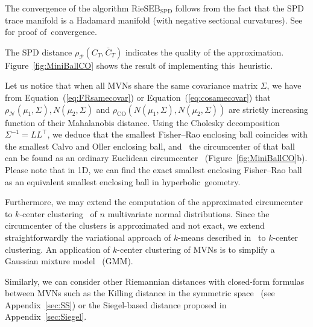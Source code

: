 \documentclass[entropy,article,accept,oneauthor,pdftex,entropy]{Definitions/mdpi}
\def\RieSEB{\mathrm{RieSEB}}
\def\CO{\mathrm{CO}}
\def\SPD{\mathrm{SPD}}
\def\calN{\mathcal{N}}
\def\SPD{\mathrm{SPD}}
\def\calP{\mathcal{P}}
\begin{document}
The convergence of the algorithm $\RieSEB_\SPD$ follows from the fact that the SPD trace manifold is a Hadamard manifold (with negative sectional curvatures). See~\cite{RieMinimax-2013} for proof of~convergence.

The SPD distance $\rho_\calP(C_T,\bar C_T)$ indicates the quality of the approximation.
Figure~\ref{fig:MiniBallCO} shows the result of implementing this~heuristic.

Let us notice that when all MVNs share the same covariance matrix $\Sigma$, we have from Equation~(\ref{eq:FRsamecovar}) or Equation~(\ref{eq:cosamecovar}) 
that $\rho_\calN(\mu_1,\Sigma),N(\mu_2,\Sigma)$ and $\rho_{\CO}(N(\mu_1,\Sigma),N(\mu_2,\Sigma))$ are strictly increasing function of their Mahalanobis distance.
Using the Cholesky decomposition $\Sigma^{-1}=LL^\top$, we deduce that the smallest Fisher–Rao enclosing ball coincides with the
smallest Calvo and Oller enclosing ball, and~ the  circumcenter of that ball can be found  as an ordinary Euclidean circumcenter~\cite{welzl2005smallest} 
(Figure~\ref{fig:MiniBallCO}b).
Please note that in 1D, we can find the exact smallest enclosing Fisher–Rao ball as an equivalent smallest enclosing ball in hyperbolic~geometry.
 

Furthermore, we may extend the computation of the approximated circumcenter to  $k$-center clustering~\cite{gonzalez1985clustering} of $n$ multivariate normal distributions. Since the circumcenter of the clusters is approximated and not exact, we extend straightforwardly the variational approach of $k$-means described in~\cite{acharyya2013bregman} to $k$-center clustering.
An application of $k$-center clustering of MVNs is to simplify a Gaussian mixture model~\cite{FRMVNReview-2020} (GMM).



Similarly, we can consider other Riemannian distances with closed-form formulas between MVNs such as the Killing distance in the symmetric space~\cite{lovric2000multivariate} (see Appendix~\ref{sec:SS}) or the Siegel-based distance proposed in Appendix~\ref{sec:Siegel}.
\end{document}
